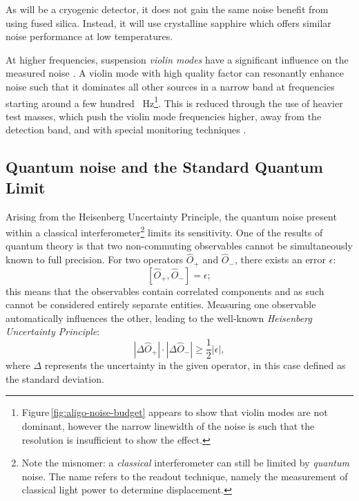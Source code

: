 As \KAGRA{} will be a cryogenic detector, it does not gain the same noise benefit from using fused silica. Instead, it will use crystalline sapphire which offers similar noise performance at low temperatures.

At higher frequencies, suspension \emph{violin modes} have a significant influence on the measured noise \cite{Robertson2002}. A violin mode with high quality factor can resonantly enhance noise such that it dominates all other sources in a narrow band at frequencies starting around a few hundred \SI{}{\hertz}\footnote{Figure\,\ref{fig:aligo-noise-budget} appears to show that violin modes are not dominant, however the narrow linewidth of the noise is such that the resolution is insufficient to show the effect.}. This is reduced through the use of heavier test masses, which push the violin mode frequencies higher, away from the detection band, and with special monitoring techniques \cite{Sorazu2010}.

\subsection{\label{sec:quantum-noise}Quantum noise and the Standard Quantum Limit}
Arising from the Heisenberg Uncertainty Principle, the quantum noise present within a classical interferometer\footnote{Note the misnomer: a \emph{classical} interferometer can still be limited by \emph{quantum} noise. The name refers to the readout technique, namely the measurement of classical light power to determine displacement.} limits its sensitivity. One of the results of quantum theory is that two non-commuting observables cannot be simultaneously known to full precision. For two operators $\hat{O}_+$ and $\hat{O}_-$, there exists an error $\epsilon$:
\begin{equation}
 \left[ \hat{O}_+, \hat{O}_- \right] = \epsilon;
\end{equation}
this means that the observables contain correlated components and as such cannot be considered entirely separate entities. Measuring one observable automatically influences the other, leading to the well-known \emph{Heisenberg Uncertainty Principle}:
\begin{equation}
 \left| \Delta \hat{O}_+ \right| \cdot \left| \Delta \hat{O}_- \right| \geq
\frac{1}{2} \left| \epsilon \right|,
\end{equation}
where $\Delta$ represents the uncertainty in the given operator, in this case defined as the standard deviation.


